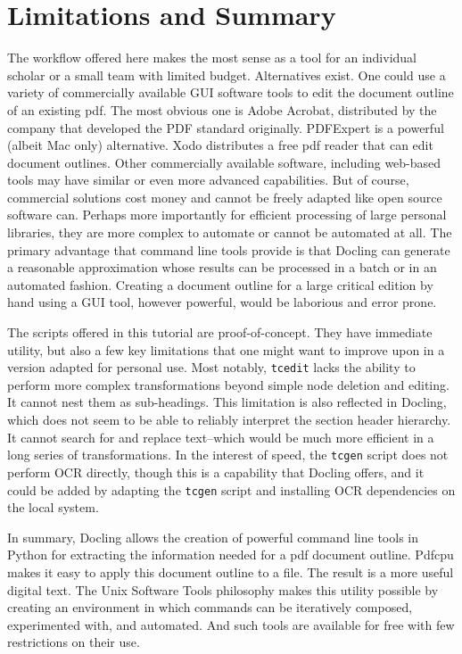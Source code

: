 \documentclass[
  letterpaper,
]{tufte-handout}
\begin{document}
\section{Limitations and Summary}\label{limitations-and-summary}

The workflow offered here makes the most sense as a tool for an
individual scholar or a small team with limited budget. Alternatives
exist. One could use a variety of commercially available GUI software
tools to edit the document outline of an existing pdf. The most obvious
one is Adobe Acrobat, distributed by the company that developed the PDF
standard originally. PDFExpert is a powerful (albeit Mac only)
alternative. Xodo distributes a free pdf reader that can edit document
outlines. Other commercially available software, including web-based
tools may have similar or even more advanced capabilities. But of
course, commercial solutions cost money and cannot be freely adapted
like open source software can. Perhaps more importantly for efficient
processing of large personal libraries, they are more complex to
automate or cannot be automated at all. The primary advantage that
command line tools provide is that Docling can generate a reasonable
approximation whose results can be processed in a batch or in an
automated fashion. Creating a document outline for a large critical
edition by hand using a GUI tool, however powerful, would be laborious
and error prone.

The scripts offered in this tutorial are proof-of-concept. They have
immediate utility, but also a few key limitations that one might want to
improve upon in a version adapted for personal use. Most notably,
\texttt{tcedit} lacks the ability to perform more complex
transformations beyond simple node deletion and editing. It cannot nest
them as sub-headings. This limitation is also reflected in Docling,
which does not seem to be able to reliably interpret the section header
hierarchy. It cannot search for and replace text--which would be much
more efficient in a long series of transformations. In the interest of
speed, the \texttt{tcgen} script does not perform OCR directly, though
this is a capability that Docling offers, and it could be added by
adapting the \texttt{tcgen} script and installing OCR dependencies on
the local system.

In summary, Docling allows the creation of powerful command line tools
in Python for extracting the information needed for a pdf document
outline. Pdfcpu makes it easy to apply this document outline to a file.
The result is a more useful digital text. The Unix Software Tools
philosophy makes this utility possible by creating an environment in
which commands can be iteratively composed, experimented with, and
automated. And such tools are available for free with few restrictions
on their use.
\end{document}

